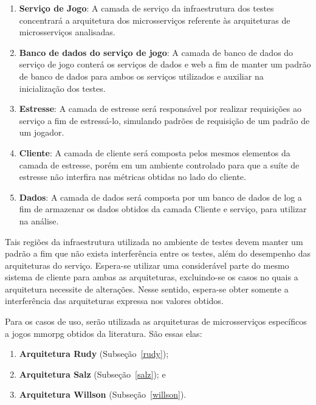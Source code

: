 \begin{enumerate}
  \item \textbf{Serviço de Jogo}: A camada de serviço da infraestrutura dos testes concentrará a arquitetura dos microsserviços referente às arquiteturas de microsserviços analisadas.
  \item \textbf{Banco de dados do serviço de jogo}: A camada de banco de dados do serviço de jogo conterá os serviços de dados e web a fim de manter um padrão de banco de dados para ambos os serviços utilizados e auxiliar na inicialização dos testes.
  \item \textbf{Estresse}: A camada de estresse será responsável por realizar requisições ao serviço a fim de estressá-lo, simulando padrões de requisição de um padrão de um jogador.
  \item \textbf{Cliente}: A camada de cliente será composta pelos mesmos elementos da camada de estresse, porém em um ambiente controlado para que a suíte de estresse não interfira nas métricas obtidas no lado do cliente.
  \item \textbf{Dados}: A camada de dados será composta por um banco de dados de log a fim de armazenar os dados obtidos da camada Cliente e serviço, para utilizar na análise.
\end{enumerate}



Tais regiões da infraestrutura utilizada no ambiente de testes devem manter um padrão a fim que não exista interferência entre os testes, além do desempenho das arquiteturas do serviço.
%
Espera-se utilizar uma considerável parte do mesmo sistema de cliente para ambas as arquiteturas, excluindo-se os casos no quais a arquitetura necessite de alterações.
%
Nesse sentido, espera-se obter somente a interferência das arquiteturas expressa nos valores obtidos.



Para os casos de uso, serão utilizada as arquiteturas de microsserviços específicos a jogos \ac{mmorpg} obtidos da literatura.
%
São essas elas:



\begin{enumerate}
  \item \textbf{Arquitetura Rudy} (Subseção~\ref{rudy});
  \item \textbf{Arquitetura Salz} (Subseção~\ref{salz}); e
  \item \textbf{Arquitetura Willson} (Subseção~\ref{willson}).
\end{enumerate}



